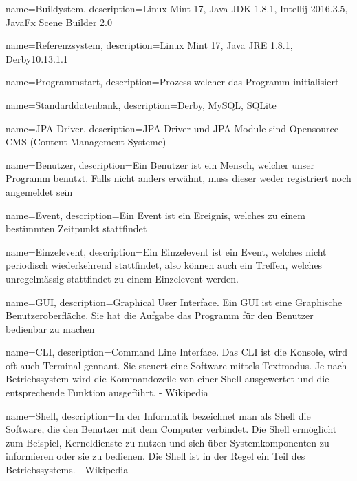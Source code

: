 
{
  name=Buildystem,
  description={Linux Mint 17, Java JDK 1.8.1, Intellij 2016.3.5, JavaFx Scene Builder 2.0}
} 

{
  name=Referenzsystem,
  description={Linux Mint 17, Java JRE 1.8.1, Derby10.13.1.1}
} 

{
  name=Programmstart,
  description={Prozess welcher das Programm initialisiert}
} 


 
{
  name=Standarddatenbank,
  description={Derby, MySQL, SQLite}
} 


{
  name=JPA Driver,
  description={JPA Driver und JPA Module sind Opensource CMS (Content Management Systeme)}
} 

{
  name=Benutzer,
  description={Ein Benutzer ist ein Mensch, welcher unser Programm benutzt. Falls nicht anders erwähnt, muss dieser weder registriert noch angemeldet sein}
} 


{
  name=Event,
  description={Ein Event ist ein Ereignis, welches zu einem bestimmten Zeitpunkt stattfindet}
} 

{
  name=Einzelevent,
  description={Ein Einzelevent ist ein Event, welches nicht periodisch wiederkehrend stattfindet, also können auch
   ein Treffen, welches unregelmässig stattfindet zu einem Einzelevent werden.}
} 

{
  name=GUI,
  description={Graphical User Interface. Ein GUI ist eine Graphische Benutzeroberfläche. Sie hat die Aufgabe das Programm für den Benutzer bedienbar zu machen}
} 

{
  name=CLI,
  description={Command Line Interface. Das CLI ist die Konsole, wird oft auch Terminal gennant. Sie steuert eine
  Software mittels Textmodus. Je nach Betriebssystem wird die Kommandozeile von einer Shell ausgewertet und die
  entsprechende Funktion ausgeführt.
  - Wikipedia}
}

{
  name=Shell,
  description={In der Informatik bezeichnet man als Shell die Software, die den Benutzer mit dem Computer verbindet.
  Die Shell ermöglicht zum Beispiel, Kerneldienste zu nutzen und sich über Systemkomponenten zu informieren oder sie zu
  bedienen. Die Shell ist in der Regel ein Teil des Betriebssystems.
  - Wikipedia
  }
}


